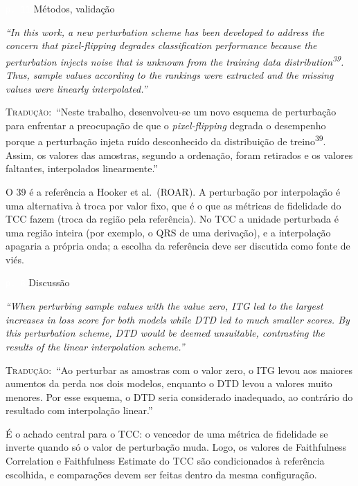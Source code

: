 \documentclass[11pt,a4paper]{article}
\newcommand{\pagechip}[1]{{\setlength{\fboxsep}{1.5pt}\colorbox{cAcc}{\textcolor{white}{\scriptsize\texttt{#1}}}}}
\newenvironment{origquote}{\par\itshape\small}{\par}
\newenvironment{tradquote}{\par\small\textsc{Tradução:}\ }{\par}
\newcommand{\explab}[1]{\par\smallskip{\small\color{cAcc}\textbf{\MakeUppercase{#1}}}\par}
\begin{document}
\begin{citacard}{\pagechip{p. 11} Métodos, validação}
\begin{origquote}“In this work, a new perturbation scheme has been developed to address the concern that pixel-flipping degrades classification performance because the perturbation injects noise that is unknown from the training data distribution\textsuperscript{39}. Thus, sample values according to the rankings were extracted and the missing values were linearly interpolated.”\end{origquote}
\begin{tradquote}“Neste trabalho, desenvolveu-se um novo esquema de perturbação para enfrentar a preocupação de que o \textit{pixel-flipping} degrada o desempenho porque a perturbação injeta ruído desconhecido da distribuição de treino\textsuperscript{39}. Assim, os valores das amostras, segundo a ordenação, foram retirados e os valores faltantes, interpolados linearmente.”\end{tradquote}
\explab{Explicação}
O 39 é a referência a Hooker et al.\ (ROAR). A perturbação por interpolação é uma alternativa à troca por valor fixo, que é o que as métricas de fidelidade do TCC fazem (troca da região pela referência). No TCC a unidade perturbada é uma região inteira (por exemplo, o QRS de uma derivação), e a interpolação apagaria a própria onda; a escolha da referência deve ser discutida como fonte de viés.
\end{citacard}

\begin{citacard}{\pagechip{p. 8} Discussão}
\begin{origquote}“When perturbing sample values with the value zero, ITG led to the largest increases in loss score for both models while DTD led to much smaller scores. By this perturbation scheme, DTD would be deemed unsuitable, contrasting the results of the linear interpolation scheme.”\end{origquote}
\begin{tradquote}“Ao perturbar as amostras com o valor zero, o ITG levou aos maiores aumentos da perda nos dois modelos, enquanto o DTD levou a valores muito menores. Por esse esquema, o DTD seria considerado inadequado, ao contrário do resultado com interpolação linear.”\end{tradquote}
\explab{Explicação}
É o achado central para o TCC: o vencedor de uma métrica de fidelidade se inverte quando só o valor de perturbação muda. Logo, os valores de Faithfulness Correlation e Faithfulness Estimate do TCC são condicionados à referência escolhida, e comparações devem ser feitas dentro da mesma configuração.
\end{citacard}
\end{document}
